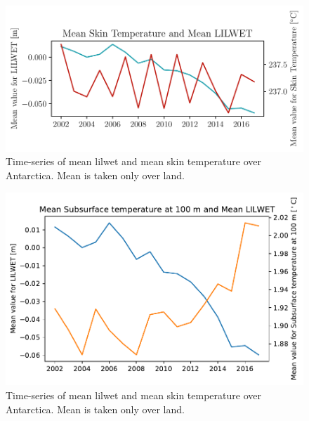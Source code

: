 \documentclass[../main.tex]{subfiles}
\begin{document}
\begin{figure}[!hbt]
    \centering
    \includegraphics{images/2021w5/chapter7/hres/tiemseries_skt_LIC}
    \caption{Time-series of mean \gls{lilwet} and mean skin temperature over Antarctica. Mean is taken only over land.}
    \label{fig:timeseries_skt}
\end{figure}
\begin{figure}[!hbt]
    \centering
    \includegraphics{images/2021w5/chapter7/hres/tiemseries_subsurtemp_100}
    \caption{Time-series of mean \gls{lilwet} and mean skin temperature over Antarctica. Mean is taken only over land.}
    \label{fig:timeseries_subsurtemp_100}
\end{figure}
\end{document}
